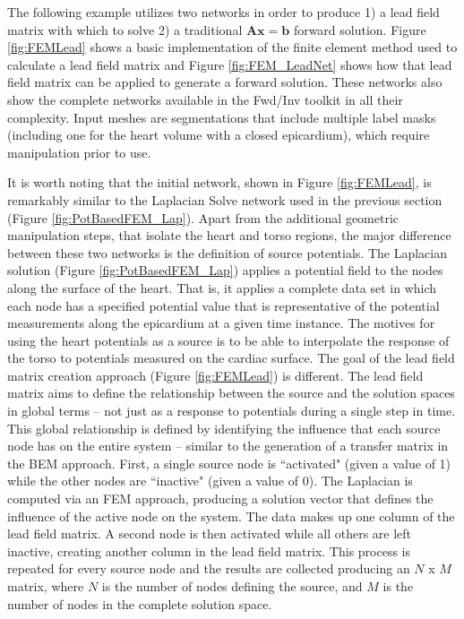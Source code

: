 The following example utilizes two networks in order to produce 1) a lead field matrix with which to solve 
2) a traditional $\mathbf{Ax=b}$ forward solution. 
Figure \ref{fig:FEMLead} shows a basic implementation of the finite element method used to calculate a lead field matrix and Figure \ref{fig:FEM_LeadNet} shows how that lead field matrix can be applied to generate a forward solution. 
These networks also show the complete networks available in the Fwd/Inv toolkit in all their complexity.  
Input meshes are segmentations that include multiple label masks (including one for the heart volume with a closed epicardium), which require manipulation prior to use. 

It is worth noting that the initial network, shown in Figure \ref{fig:FEMLead}, is remarkably similar to the Laplacian Solve network used in the previous section (Figure \ref{fig:PotBasedFEM_Lap}). 
Apart from the additional geometric manipulation steps, that isolate the heart and torso regions, the major difference between these two networks is the definition of source potentials. 
The Laplacian solution (Figure \ref{fig:PotBasedFEM_Lap}) applies a potential field to the nodes along the surface of the heart.  
That is, it applies a complete data set in which each node has a specified potential value that is representative of the potential measurements along the epicardium at a given time instance. 
The motives for using the heart potentials as a source is to be able to interpolate the response of the torso to potentials measured on the cardiac surface. 
The goal of the lead field matrix creation approach (Figure \ref{fig:FEMLead}) is different. 
The lead field matrix aims to define the relationship between the source and the solution spaces in global terms -- not just as a response to potentials during a single step in time. 
This global relationship is defined by identifying the influence that each source node has on the entire system -- similar to the generation of a transfer matrix in the BEM approach. 
First, a single source node is ``activated" (given a value of 1) while the other nodes are ``inactive" (given a value of 0). 
The Laplacian is computed via an FEM approach, producing a solution vector that defines the influence of the active node on the system. 
The data makes up one column of the lead field matrix. 
A second node is then activated while all others are left inactive, creating another column in the lead field matrix. 
This process is repeated for every source node and the results are collected producing an $N$ x $M$ matrix, where $N$ is the number of nodes defining the source, and $M$ is the number of nodes in the complete solution space. 

